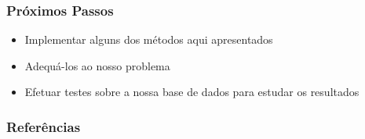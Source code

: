 \documentclass[brazil,a4paper,12pt]{beamer}%
\begin{document}
   \begin{frame}
     \frametitle{Próximos Passos}
      \begin{itemize}
       \item{Implementar alguns dos métodos aqui apresentados}
       \item{Adequá-los ao nosso problema}
       \item{Efetuar testes sobre a nossa base de dados para estudar os resultados}
      \end{itemize}
   \end{frame}

   \begin{frame}
      \frametitle{Referências}
      
      
   \end{frame}
\end{document}

